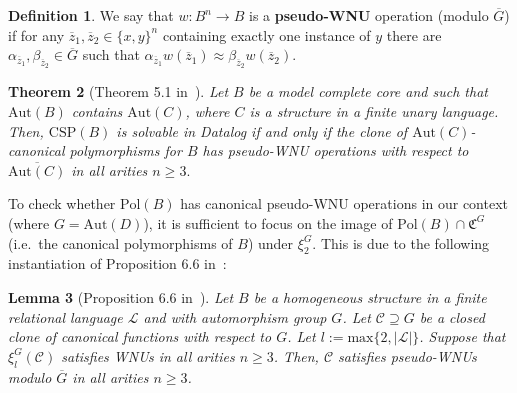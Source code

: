 \documentclass{article}
\newtheorem{theorem}{Theorem}[section]
\newtheorem{lemma}[theorem]{Lemma}
\theoremstyle{remark}
\theoremstyle{definition}
\newtheorem{definition}[theorem]{Definition}
\def\acts{\curvearrowright}
\begin{document}
\begin{definition} 
We say that $w:B^n\to B$ is a \textbf{pseudo-WNU} operation (modulo $\overline{G}$) if for any $\overline{z}_1, \overline{z}_2\in\{x,y\}^n$ containing exactly one instance of $y$ there are $\alpha_{\overline{z}_1}, \beta_{\overline{z}_2}\in\overline{G}$ such that $\alpha_{\overline{z}_1}w(\overline{z}_1)\approx\beta_{\overline{z}_2} w(\overline{z}_2)$.
\end{definition}

\begin{theorem}[Theorem 5.1 in~\cite{mottet2021symmetries}]\label{thm:symmetriesmott} Let $B$ be a model complete core and such that $\mathrm{Aut}(B)$ contains $\mathrm{Aut}(C)$, where $C$ is a structure in a finite unary language. Then, $\mathrm{CSP}(B)$ is solvable in Datalog if and only if the clone of $\mathrm{Aut}(C)$-canonical polymorphisms for $B$ has pseudo-WNU operations  with respect to $\overline{\mathrm{Aut}(C)}$ in all arities $n\geq 3.$
\end{theorem}

To check whether $\mathrm{Pol}(B)$ has canonical pseudo-WNU operations in our context (where $G=\mathrm{Aut}(D)$), it is sufficient to focus on 
the image of $\mathrm{Pol}(B)\cap\mathfrak{C}^G$ (i.e.~the canonical polymorphisms of $B$) under $\xi_2^G$. 
This is due to the following instantiation of Proposition 6.6 in~\cite{BPP-projective-homomorphisms}:

\begin{lemma}[{Proposition 6.6 in~\cite{BPP-projective-homomorphisms}}]\label{lem:pclonhom} Let $B$ be a homogeneous structure in a finite relational language $\mathcal{L}$ and with automorphism group $G$. Let $\mathcal{C}\supseteq G$ be a closed clone of canonical functions with respect to $G$. Let $l:=\mathrm{max}\{2, |\mathcal{L}|\}$. Suppose that $\xi_l^G(\mathcal{C})$ satisfies WNUs in all arities $n\geq 3$. Then, $\mathcal{C}$ satisfies pseudo-WNUs modulo $\overline{G}$ in all arities $n\geq 3$. 
\end{lemma}
\end{document}
